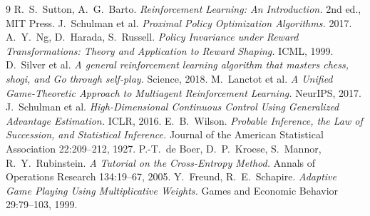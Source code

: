 \documentclass{article}
\begin{document}
\begin{thebibliography}{9}
\small
{} R.\ S.\ Sutton, A.\ G.\ Barto. \emph{Reinforcement Learning: An
Introduction.} 2nd ed., MIT Press.
 J.\ Schulman et al. \emph{Proximal Policy Optimization Algorithms.} 2017.
 A.\ Y.\ Ng, D.\ Harada, S.\ Russell. \emph{Policy Invariance under Reward
Transformations: Theory and Application to Reward Shaping.} ICML, 1999.
 D.\ Silver et al. \emph{A general reinforcement learning algorithm
that masters chess, shogi, and Go through self-play.} Science, 2018.
 M.\ Lanctot et al. \emph{A Unified Game-Theoretic Approach to Multiagent
Reinforcement Learning.} NeurIPS, 2017.
 J.\ Schulman et al. \emph{High-Dimensional Continuous Control Using
Generalized Advantage Estimation.} ICLR, 2016.
 E.\ B.\ Wilson. \emph{Probable Inference, the Law of Succession, and
Statistical Inference.} Journal of the American Statistical Association 22:209--212, 1927.
 P.-T.\ de Boer, D.\ P.\ Kroese, S.\ Mannor, R.\ Y.\ Rubinstein. \emph{A
Tutorial on the Cross-Entropy Method.} Annals of Operations Research 134:19--67, 2005.
 Y.\ Freund, R.\ E.\ Schapire. \emph{Adaptive Game Playing Using
Multiplicative Weights.} Games and Economic Behavior 29:79--103, 1999.
\end{thebibliography}
\end{document}
